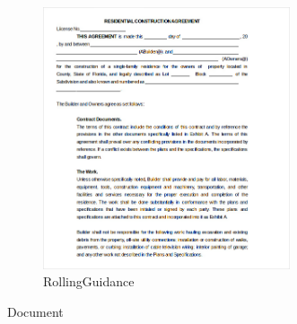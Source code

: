 \documentclass[12pt]{article}
\begin{document}
\begin{figure}
		\begin{subfigure}{0.4\textwidth}
			\centering
			\includegraphics[width=0.8\textwidth]{document/documentjpgRollingGuidanceFilter.png}
			\caption{RollingGuidance}
		\end{subfigure}
		\caption{Document}
	\end{figure}
\end{document}
